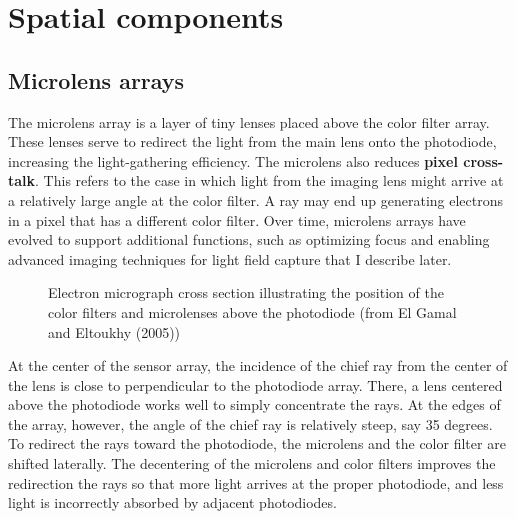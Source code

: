 \documentclass[
  letterpaper,
]{book}
\begin{document}
\section{Spatial components}\label{sec-sensor-space}

\subsection{Microlens arrays}\label{sec-sensor-microlens}

The microlens array is a layer of tiny lenses placed above the color
filter array. These lenses serve to redirect the light from the main
lens onto the photodiode, increasing the light-gathering efficiency. The
microlens also reduces \textbf{pixel cross-talk}. This refers to the
case in which light from the imaging lens might arrive at a relatively
large angle at the color filter. A ray may end up generating electrons
in a pixel that has a different color filter. Over time, microlens
arrays have evolved to support additional functions, such as optimizing
focus and enabling advanced imaging techniques for light field capture
that I describe later.

\begin{figure}


\caption{\label{fig-components-microlens}Electron micrograph cross
section illustrating the position of the color filters and microlenses
above the photodiode (from El Gamal and Eltoukhy (2005))}

\end{figure}%

At the center of the sensor array, the incidence of the chief ray from
the center of the lens is close to perpendicular to the photodiode
array. There, a lens centered above the photodiode works well to simply
concentrate the rays. At the edges of the array, however, the angle of
the chief ray is relatively steep, say 35 degrees. To redirect the rays
toward the photodiode, the microlens and the color filter are shifted
laterally. The decentering of the microlens and color filters improves
the redirection the rays so that more light arrives at the proper
photodiode, and less light is incorrectly absorbed by adjacent
photodiodes.
\end{document}
